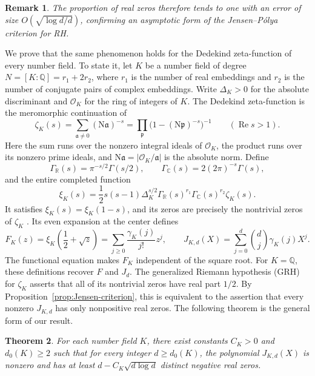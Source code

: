 \documentclass[11pt,reqno]{amsart}
\numberwithin{equation}{section}
\newtheorem{theorem}{Theorem}
\newtheorem{remark}[theorem]{Remark}
\renewcommand{\Re}{\operatorname{Re}}
\begin{document}
\begin{remark}
The proportion of real zeros therefore tends to one with an error
of size $O(\sqrt{\log d/d})$, confirming an asymptotic form of the
Jensen--P\'olya criterion for RH.
\end{remark}

We prove that the same phenomenon holds for the Dedekind zeta-function of every number
field. To state it, let $K$ be a number field of degree
$N=[K:\mathbb Q]=r_1+2r_2$, where $r_1$ is the number of real
embeddings and $r_2$ is the number of conjugate pairs of complex
embeddings. Write $\Delta_K>0$ for the absolute discriminant and
$\mathcal O_K$ for the ring of integers of $K$. The Dedekind
zeta-function is the meromorphic continuation of
\[
 \zeta_K(s)=\sum_{\mathfrak a\ne0}(\mathrm N\mathfrak a)^{-s}
          =\prod_{\mathfrak p}
             \bigl(1-(\mathrm N\mathfrak p)^{-s}\bigr)^{-1}
 \qquad(\Re s>1).
\]
Here the sum runs over the nonzero integral ideals of $\mathcal O_K$,
the product runs over its nonzero prime ideals, and
$\mathrm N\mathfrak a=|\mathcal O_K/\mathfrak a|$ is the absolute
norm. Define
\[
 \Gamma_{\mathbb R}(s)=\pi^{-s/2}\Gamma(s/2),\qquad
 \Gamma_{\mathbb C}(s)=2(2\pi)^{-s}\Gamma(s),
\]
and the entire completed function
\begin{equation}\label{eq:xi-K-definition}
 \xi_K(s)=\frac12s(s-1)\Delta_K^{s/2}
          \Gamma_{\mathbb R}(s)^{r_1}
          \Gamma_{\mathbb C}(s)^{r_2}\zeta_K(s).
\end{equation}
It satisfies $\xi_K(s)=\xi_K(1-s)$, and its zeros are precisely
the nontrivial zeros of $\zeta_K$ \cite[Section~2.1]{HSW}.
Its even expansion at the center defines
\begin{equation}\label{eq:FK-JK-definition}
 F_K(z)=\xi_K\!\left(\frac12+\sqrt z\right)
       =\sum_{j\ge0}\frac{\gamma_K(j)}{j!}z^j,
 \qquad
 J_{K,d}(X)=\sum_{j=0}^d\binom dj\gamma_K(j)X^j.
\end{equation}
The functional equation makes $F_K$ independent of the square root.
For $K=\mathbb Q$, these definitions recover $F$ and $J_d$.
The generalized Riemann hypothesis (GRH) for $\zeta_K$ asserts
that all of its nontrivial zeros have real part $1/2$.
By Proposition~\ref{prop:Jensen-criterion}, this is equivalent to
the assertion that every nonzero $J_{K,d}$ has only nonpositive
real zeros.
The following theorem is the general form of our result. 

\begin{theorem}\label{thm:Dedekind}
For each number field $K$, there exist constants $C_K>0$ and $d_0(K)\ge2$ such that for every integer $d\ge d_0(K)$, the polynomial $J_{K,d}(X)$ is nonzero and has at least $d-C_K\sqrt{d\log d}$ distinct negative real zeros. 
\end{theorem}
\end{document}

